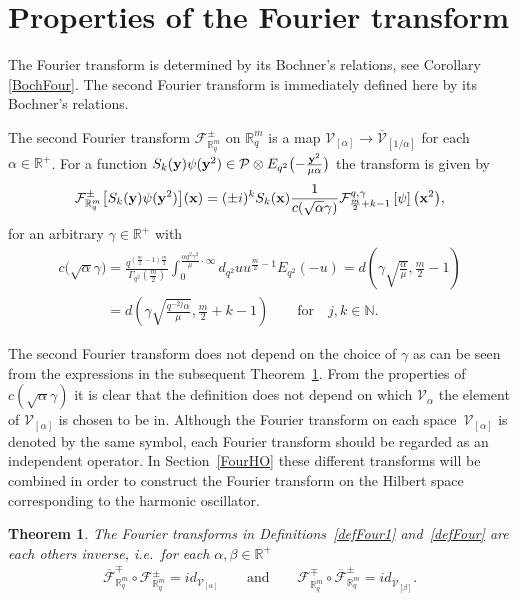 \documentclass[11pt]{article}
\newtheorem{theorem}{Theorem}
\newcommand{\mR}{\mathbb{R}}
\newcommand{\mN}{\mathbb{N}}
\newcommand{\cF}{\mathcal{F}}
\newcommand{\cP}{\mathcal{P}}
\newcommand{\cV}{\mathcal{V}}
\numberwithin{equation}{section}
\begin{document}
\section{Properties of the Fourier transform}
\label{behave}



The Fourier transform is determined by its Bochner's relations, see Corollary \ref{BochFour}. The second Fourier transform is immediately def\/ined here by its Bochner's relations.
\begin{definition}
\label{defFour}
The second Fourier transform $\cF^{\pm}_{\mR^m_q}$ on $\mR^m_q$ is a map $\cV_{[\alpha]}\to\overline{\cV}_{[1/\alpha]}$ for each $\alpha\in\mR^+$. For a function $S_k(\bold{y})\psi(\bold{y}^2)\in\cP\otimes E_{q^2}\big({-}\frac{\bold{y}^2}{\mu\alpha}\big)$ the transform is given by
\begin{gather*}
\cF^{\pm}_{\mR^m_q}\big[S_k(\bold{y})\psi(\bold{y}^2)\big](\bold{x}) = (\pm i)^kS_k(\bold{x})\frac{1}{c(\sqrt{\alpha}\gamma)}\cF^{q,\gamma}_{\frac{m}{2}+k-1}\left[\psi\right]\big(\bold{x}^2\big),
\end{gather*}
for an arbitrary $\gamma\in\mR^+$ with
\begin{gather*}
c\big(\sqrt{\alpha}\gamma\big) = \frac{q^{(\frac{m}{2}-1)\frac{m}{2}}}{\Gamma_{q^2}(\frac{m}{2})}\int_0^{\frac{\alpha q^2\gamma^2 }{\mu}\cdot\infty}d_{q^2}u u^{\frac{m}{2}-1}E_{q^2}(-u)=d\left(\gamma\sqrt{\frac{\alpha}{\mu}},\frac{m}{2}-1\right)\\
 \phantom{c\big(\sqrt{\alpha}\gamma\big)}{}
 = d\left(\gamma\sqrt{\frac{q^{-2j}\alpha}{\mu}},\frac{m}{2}+k-1\right)\qquad\mbox{for} \quad j,k\in\mN.
\end{gather*}
\end{definition}
The second Fourier transform does not depend on the choice of $\gamma$ as can be seen from the expressions in the subsequent Theorem~\ref{Fourinv}. From the properties of $c(\sqrt{\alpha}\gamma)$ it is clear that the def\/inition does not depend on which $\cV_\alpha$ the element of $\cV_{[\alpha]}$ is chosen to be in. Although the Fourier transform on each space~$\cV_{[\alpha]}$ is denoted by the same symbol, each Fourier transform should be regarded as an independent operator. In Section~\ref{FourHO} these dif\/ferent transforms will be combined in order to construct the Fourier transform on the Hilbert space corresponding to the harmonic oscillator.


\begin{theorem}
\label{Fourinv}
The Fourier transforms in Definitions~{\rm \ref{defFour1}} and~{\rm \ref{defFour}} are each others inverse, i.e.\ for each $\alpha,\beta\in\mR^+$
\begin{gather*}
\overline{\cF}_{\mR^m_q}^{\mp}\circ\cF^{\pm}_{\mR^m_q} = id_{\cV_{[\alpha]}}\qquad\mbox{and}\qquad
\cF_{\mR^m_q}^{\mp}\circ\overline{\cF}^{\pm}_{\mR^m_q} = id_{\overline{\cV}_{[\beta]}}.
\end{gather*}
\end{theorem}
\end{document}
